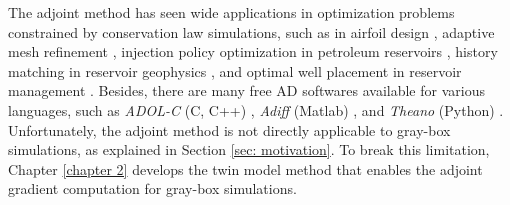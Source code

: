 The adjoint method has seen wide applications in optimization problems constrained by 
conservation law simulations, such as in
airfoil design \cite{adjoint aerodynamics, adjoint aerodynamics 2, 
adjoint aerodynamics AD}, adaptive mesh refinement
\cite{discrete adjoint phd}, injection policy optimization in petroleum reservoirs
\cite{adjoint reservoir optimal control}, 
history matching in reservoir geophysics
\cite{review adjoint geo}, and optimal well placement in reservoir management 
\cite{adjoint well place}.
Besides, there are many free AD softwares available for various languages, such as
\emph{ADOL-C} (C, C++) \cite{adolc}, \emph{Adiff} (Matlab) \cite{adiff}, and \emph{Theano} (Python)
\cite{theano}.
Unfortunately, the adjoint method is not directly applicable
to gray-box simulations, as explained in Section \ref{sec: motivation}. 
To break this limitation, Chapter \ref{chapter 2} develops the twin model method
that enables the adjoint gradient computation for gray-box simulations.\\


